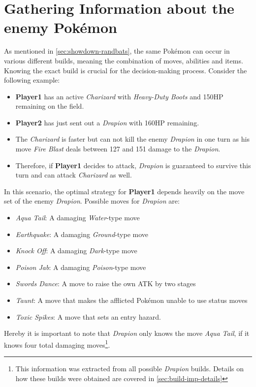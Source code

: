 \section{Gathering Information about the enemy Pokémon}
\label{sec:builds-randbats}
As mentioned in \ref{sec:showdown-randbats}, the same Pokémon can occur in various different builds, meaning the combination
of moves, abilities and items. Knowing the exact build is crucial for the decision-making process. Consider the following
example: 
\begin{itemize}
	\item \textbf{Player1} has an active \textit{Charizard} with \textit{Heavy-Duty Boots} and 150\ac{HP} remaining on the field.
	\item \textbf{Player2} has just sent out a \textit{Drapion} with 160\ac{HP} remaining.
	\item The \textit{Charizard} is faster but can not kill the enemy \textit{Drapion} in one turn as his move 
	\textit{Fire Blast} deals between 127 and 151 damage to the \textit{Drapion}. 
	\item Therefore, if \textbf{Player1} decides to attack, \textit{Drapion} is guaranteed to survive this turn
	and can attack \textit{Charizard} as well.
\end{itemize}
In this scenario, the optimal strategy for \textbf{Player1} depends heavily on the move set of the enemy \textit{Drapion}.
Possible moves for \textit{Drapion} are:
\begin{itemize}
	\item \textit{Aqua Tail}: A damaging \textit{Water}-type move
	\item \textit{Earthquake}: A damaging \textit{Ground}-type move
	\item \textit{Knock Off}: A damaging \textit{Dark}-type move
	\item \textit{Poison Jab}: A damaging \textit{Poison}-type move
	\item \textit{Swords Dance}: A move to raise the own \ac{ATK} by two stages
	\item \textit{Taunt}: A move that makes the afflicted Pokémon unable to use status moves
	\item \textit{Toxic Spikes}: A move that sets an entry hazard.
\end{itemize}
Hereby it is important to note that \textit{Drapion} only knows the move \textit{Aqua Tail}, if it knows four total 
damaging moves\footnote{This information was extracted from all possible \textit{Drapion} builds. Details on 
how these builds were obtained are covered in \ref{sec:build-imp-details}}. 
